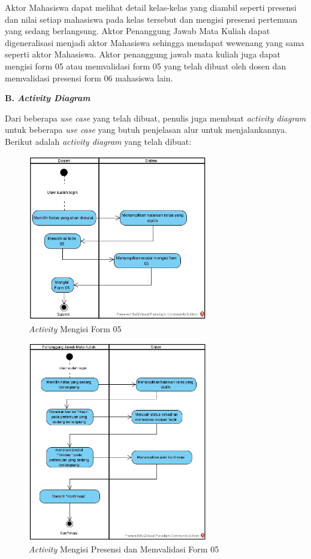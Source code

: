 Aktor Mahasiswa dapat melihat detail kelas-kelas yang diambil seperti presensi dan nilai setiap mahasiswa pada kelas tersebut dan mengisi presensi pertemuan yang sedang berlangsung.
Aktor Penanggung Jawab Mata Kuliah dapat digeneralisasi menjadi aktor Mahasiswa sehingga mendapat wewenang yang sama seperti aktor Mahasiswa. Aktor penanggung jawab mata kuliah juga dapat mengisi form 05 atau memvalidasi form 05 yang telah dibuat oleh dosen dan memvalidasi presensi form 06 mahasiswa lain.

\textbf{B. \textit{Activity Diagram}}

Dari beberapa \textit{use case} yang telah dibuat, penulis juga membuat \textit{activity diagram} untuk beberapa \textit{use case} yang butuh penjelasan alur untuk menjalankannya. Berikut adalah \textit{activity diagram} yang telah dibuat:

\begin{figure}[h!]
	\centering
	\includegraphics[width=0.7\textwidth]{gambar/diagram/Mengisi Form 05}
	\caption{\textit{Activity} Mengisi Form 05}
	\label{fig:activity2}
\end{figure}

\begin{figure}[h!]
	\centering
	\includegraphics[width=0.7\textwidth]{gambar/diagram/Mengisi Presensi dan Memvalidasi Form 05}
	\caption{\textit{Activity} Mengisi Presensi dan Memvalidasi Form 05}
	\label{fig:activity1}
\end{figure}

